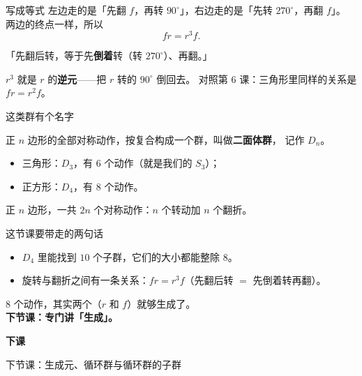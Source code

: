 \documentclass[10pt]{beamer}
\begin{document}
\begin{frame}{写成等式}
  左边走的是「先翻 \(f\)，再转 \(90^\circ\)」，右边走的是「先转 \(270^\circ\)，再翻 \(f\)」。
  两边的终点一样，所以
  \[
    fr=r^3f .
  \]
  \pause
  \begin{center}
    {\large 「先翻后转，等于先\textbf{倒着}转（转 \(270^\circ\)）、再翻。」}
  \end{center}
  \pause
  \begin{att}
    \(r^3\) 就是 \(r\) 的\textbf{逆元}——把 \(r\) 转的 \(90^\circ\) 倒回去。
    对照第 6 课：三角形里同样的关系是 \(fr=r^2f\)。
  \end{att}
\end{frame}

\begin{frame}{这类群有个名字}
  \begin{definition}[二面体群]
    正 \(n\) 边形的全部对称动作，按复合构成一个群，叫做\textbf{二面体群}，
    记作 \(D_n\)。
  \end{definition}
  \pause
  \begin{itemize}
    \item 三角形：\(D_3\)，有 \(6\) 个动作（就是我们的 \(S_3\)）；
    \item 正方形：\(D_4\)，有 \(8\) 个动作。
  \end{itemize}
  \pause
  \begin{center}
    {\large 正 \(n\) 边形，一共 \(2n\) 个对称动作：\(n\) 个转动加 \(n\) 个翻折。}
  \end{center}
\end{frame}

\begin{frame}{这节课要带走的两句话}
  \begin{itemize}
    \item \(D_4\) 里能找到 \(10\) 个子群，它们的大小都能整除 \(8\)。
    \item 旋转与翻折之间有一条关系：\(fr=r^3f\)（先翻后转 \(=\) 先倒着转再翻）。
  \end{itemize}
  \pause
  \begin{center}
    {\large \(8\) 个动作，其实两个（\(r\) 和 \(f\)）就够生成了。}\\[0.6em]
    {\large\textcolor{textgreen}{\bfseries 下节课：专门讲「生成」。}}
  \end{center}
\end{frame}

\begin{frame}
  \begin{center}
    \vspace{1.6cm}
    {\Large\textcolor{textgreen}{\bfseries 下课}}

    \vspace{1.0cm}
    {\large\textcolor{accentgreen}{下节课：生成元、循环群与循环群的子群}}
  \end{center}
\end{frame}
\end{document}
